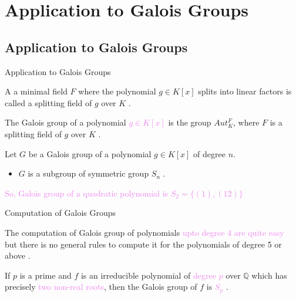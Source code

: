 \documentclass{beamer}
\begin{document}
\section{Application to Galois Groups}

\subsection{Application to Galois Groups}
\begin{frame}{Application to Galois Groups}

    A a minimal field \(F\) where the polynomial \(g \in K[x]\) splits into linear factors is called a \textcolor{green!50!black}{splitting field} of \(g\) over \(K\) \cite{hunger}.
  \vspace{3mm}

  \begin{definition}
    The Galois group of a polynomial \textcolor{violet}{\(g \in K[x]\)} is the group \(Aut_K^F\), where \(F\) is a splitting field of \(g\) over \(K\) \cite{hunger}.
  \end{definition}

\vspace{2mm}
  \begin{tcolorbox}[colback=white, colframe=blue!40, boxsep=2mm]
    \begin{theorem}
      Let \(G\) be a Galois group of a polynomial \(g \in K[x]\) of degree \(n\).
      \begin{itemize}
      \item \(G\) is  a subgroup of symmetric group \(S_n\) \cite{hunger}.
      \end{itemize}
    \end{theorem}
  \end{tcolorbox}
  \vspace{3mm}
\textcolor{violet}{So, Galois group of a quadratic polynomial is \(S_2=\{(1),(12)\}\)}
\end{frame}


\begin{frame}{Computation of Galois Groups}

  The computation of Galois group of polynomials \textcolor{violet}{upto degree 4 are quite easy}\\
  but there is no general rules to compute it for the polynomials of degree 5 or above \cite{hunger}.
  \vspace{10mm}

  \begin{tcolorbox}[colback=white, colframe=blue!40, boxsep=2mm]
\begin{theorem}[Theorem]
If \(p\) is a prime and \(f\) is an irreducible polynomial of \textcolor{violet}{degree \(p\)} over \(\mathbb{Q}\) which has precisely \textcolor{violet}{two non-real roots}, then the Galois group of \(f\) is \textcolor{violet}{\(S_p\)} \cite{hunger}.
\end{theorem}
\end{tcolorbox}
\end{frame}
\end{document}
